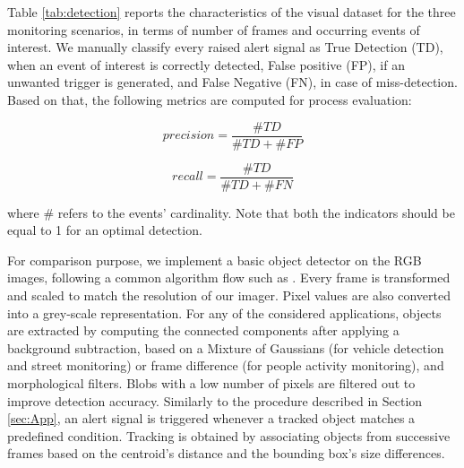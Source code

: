 \documentclass[journal]{IEEEtran}
\begin{document}
Table \ref{tab:detection} reports the characteristics of the visual dataset for the three monitoring scenarios, in terms of number of frames and occurring events of interest. We manually classify every raised alert signal as True Detection (TD), when an event of interest is correctly detected, False positive (FP), if an unwanted trigger is generated, and False Negative (FN), in case of miss-detection. Based on that, the following metrics are computed for process evaluation:

\begin{equation}
precision = \dfrac{\# TD}{\# TD + \# FP}
\end{equation}

\begin{equation}
recall = \dfrac{\# TD}{\# TD + \# FN}
\end{equation}

where $\#$ refers to the events' cardinality. Note that both the indicators should be equal to 1 for an optimal detection. 

For comparison purpose, we implement a basic object detector on the RGB images, following a common algorithm flow such as \cite{Chen2007}. Every frame is transformed and scaled to match the resolution of our imager. Pixel values are also converted into a grey-scale representation. For any of the considered applications, objects are extracted by computing the connected components after applying a background subtraction, based on a Mixture of Gaussians (for vehicle detection and street monitoring) or frame difference (for people activity monitoring), and morphological filters. 
Blobs with a low number of pixels are filtered out to improve detection accuracy. Similarly to the procedure described in Section \ref{sec:App}, an alert signal is triggered whenever a tracked object matches a predefined condition. Tracking is obtained by associating objects from successive frames based on the centroid's distance and the bounding box's size differences. 


\begin{table}[]
\caption{Monitoring application dataset}	\label{tab:detection}

\centering
{}
\end{table}
\end{document}
